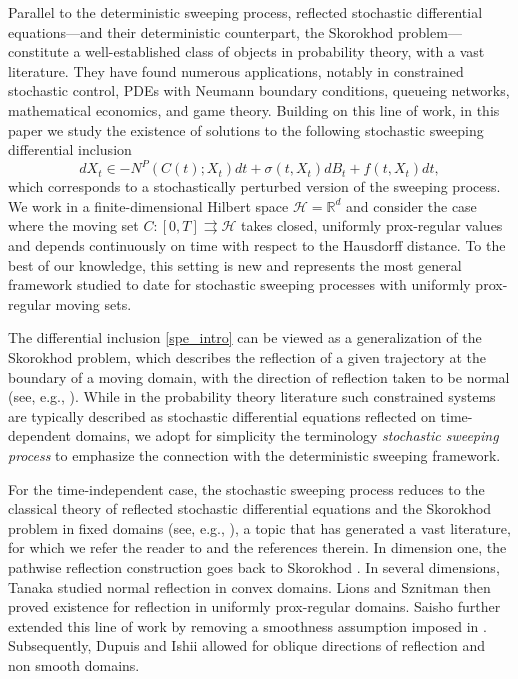 \documentclass[preprint,12pt]{elsarticle}
\newcounter{count}
\renewcommand{\H}{\mathcal{H}}
\newcommand{\tto}{\rightrightarrows}
\theoremstyle{plain}
\theoremstyle{definition}
\theoremstyle{remark}
\begin{document}
Parallel to the deterministic sweeping process, reflected stochastic differential equations—and their deterministic counterpart, the Skorokhod problem—constitute a well-established class of objects in probability theory, with a vast literature. They have found numerous applications, notably in constrained stochastic control, PDEs with Neumann boundary conditions, queueing networks, mathematical economics, and game theory.
Building on this line of work, in this paper we study the existence of solutions to the following stochastic sweeping differential inclusion
\begin{equation}\label{spe_intro}
    dX_t\in -N^P(C(t);X_t)dt + \sigma(t,X_t)dB_t + f(t,X_t)dt,
\end{equation}
which corresponds to a stochastically perturbed version of the sweeping process. We work in a finite-dimensional Hilbert space $\H=\mathbb{R}^d$ and consider the case where the moving set $C\colon[0,T]\tto \H$ takes closed, uniformly prox-regular values and depends continuously on time with respect to the Hausdorff distance. To the best of our knowledge, this setting is new and represents the most general framework studied to date for stochastic sweeping processes with uniformly prox-regular moving sets.

The differential inclusion \eqref{spe_intro} can be viewed as a generalization of the Skorokhod problem, which describes the reflection of a given trajectory at the boundary of a moving domain, with the direction of reflection taken to be normal (see, e.g., \cite{Skorokhod1961}). While in the probability theory literature such constrained systems are typically described as stochastic differential equations reflected on time-dependent domains, we adopt for simplicity the terminology \emph{stochastic sweeping process} to emphasize the connection with the deterministic sweeping framework.

For the time-independent case, the stochastic sweeping process reduces to the classical theory of reflected stochastic differential equations and the Skorokhod problem in fixed domains (see, e.g., \cite[Section 1.2]{MR2812587}), a topic that has generated a vast literature, for which we refer the reader to \cite{pilipenko2014introduction} and the references therein. In dimension one, the pathwise reflection construction goes back to Skorokhod \cite{Skorokhod1961}. In several dimensions, Tanaka \cite{MR529332} studied normal reflection in convex domains. Lions and Sznitman \cite{MR745330} then proved existence for reflection in uniformly prox-regular domains. Saisho \cite{MR873889} further extended this line of work by removing a smoothness assumption imposed in \cite{MR745330}. Subsequently, Dupuis and Ishii \cite{dupuis1993sdes} allowed for oblique directions of reflection and non smooth domains.
\end{document}
